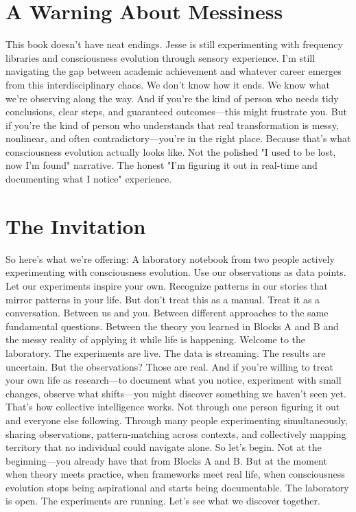 \documentclass[12pt,openany]{book}
\begin{document}
\section{A Warning About Messiness}

This book doesn't have neat endings.
Jesse is still experimenting with frequency libraries and consciousness evolution through sensory experience. I'm still navigating the gap between academic achievement and whatever career emerges from this interdisciplinary chaos.
We don't know how it ends. We know what we're observing along the way.
And if you're the kind of person who needs tidy conclusions, clear steps, and guaranteed outcomes—this might frustrate you.
But if you're the kind of person who understands that real transformation is messy, nonlinear, and often contradictory—you're in the right place.
Because that's what consciousness evolution actually looks like. Not the polished "I used to be lost, now I'm found" narrative. The honest "I'm figuring it out in real-time and documenting what I notice" experience.

\section{The Invitation}

So here's what we're offering:
A laboratory notebook from two people actively experimenting with consciousness evolution.
Use our observations as data points. Let our experiments inspire your own. Recognize patterns in our stories that mirror patterns in your life.
But don't treat this as a manual. Treat it as a conversation.
Between us and you. Between different approaches to the same fundamental questions. Between the theory you learned in Blocks A and B and the messy reality of applying it while life is happening.
Welcome to the laboratory.
The experiments are live. The data is streaming. The results are uncertain.
But the observations? Those are real.
And if you're willing to treat your own life as research—to document what you notice, experiment with small changes, observe what shifts—you might discover something we haven't seen yet.
That's how collective intelligence works.
Not through one person figuring it out and everyone else following. Through many people experimenting simultaneously, sharing observations, pattern-matching across contexts, and collectively mapping territory that no individual could navigate alone.
So let's begin.
Not at the beginning—you already have that from Blocks A and B. But at the moment when theory meets practice, when frameworks meet real life, when consciousness evolution stops being aspirational and starts being documentable.
The laboratory is open. The experiments are running.
Let's see what we discover together.
\end{document}
